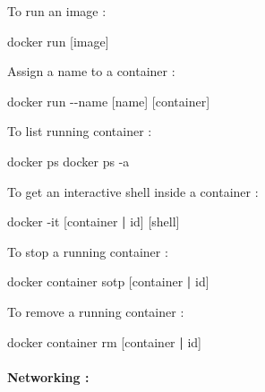 \documentclass[
  14pt,
  english,
  a4paper,
]{scrreprt}
\newenvironment{Shaded}{}{}
\newcommand{\ExtensionTok}[1]{#1}
\newcommand{\KeywordTok}[1]{\textcolor[rgb]{0.00,0.44,0.13}{\textbf{#1}}}
\newcommand{\NormalTok}[1]{#1}
\begin{document}
To run an image :

\begin{Shaded}
\begin{Highlighting}[]
\ExtensionTok{docker}\NormalTok{ run [image]}
\end{Highlighting}
\end{Shaded}

Assign a name to a container :

\begin{Shaded}
\begin{Highlighting}[]
\ExtensionTok{docker}\NormalTok{ run {-}{-}name [name] [container]}
\end{Highlighting}
\end{Shaded}

To list running container :

\begin{Shaded}
\begin{Highlighting}[]
\ExtensionTok{docker}\NormalTok{ ps}
\ExtensionTok{docker}\NormalTok{ ps {-}a}
\end{Highlighting}
\end{Shaded}

To get an interactive shell inside a container :

\begin{Shaded}
\begin{Highlighting}[]
\ExtensionTok{docker}\NormalTok{ {-}it [container }\KeywordTok{|} \ExtensionTok{id}\NormalTok{] [shell]}
\end{Highlighting}
\end{Shaded}

To stop a running container :

\begin{Shaded}
\begin{Highlighting}[]
\ExtensionTok{docker}\NormalTok{ container sotp [container }\KeywordTok{|} \ExtensionTok{id}\NormalTok{]}
\end{Highlighting}
\end{Shaded}

To remove a running container :

\begin{Shaded}
\begin{Highlighting}[]
\ExtensionTok{docker}\NormalTok{ container rm [container }\KeywordTok{|} \ExtensionTok{id}\NormalTok{]}
\end{Highlighting}
\end{Shaded}

\hypertarget{networking-1}{%
\paragraph*{Networking :}\label{networking-1}}
\end{document}
